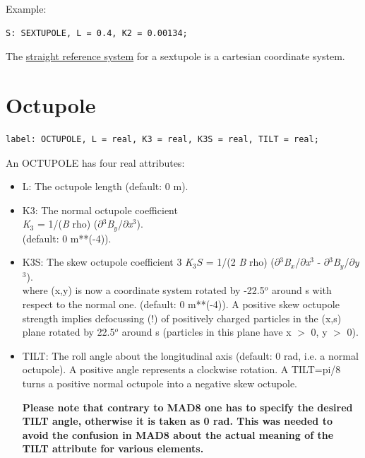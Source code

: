 Example: 
\begin{verbatim}
S: SEXTUPOLE, L = 0.4, K2 = 0.00134;
\end{verbatim} 

The \href{local_system.html#straight}{straight reference system} for a
sextupole is a cartesian coordinate system.   


%
\section{Octupole}
\label{sec:octupole}

\begin{verbatim}
label: OCTUPOLE, L = real, K3 = real, K3S = real, TILT = real;
\end{verbatim} 

An OCTUPOLE has four real attributes: 
\begin{itemize}
   \item L: The octupole length (default: 0 m). 

   \item K3: The normal octupole coefficient \\
     \textit{K}$_3$ = 1/(\textit{B} rho)
     ($\partial$$^3$\textit{B$_y$}/$\partial$\textit{x}$^3$). \\ 
     (default: 0 m**(-4)). 

   \item K3S: The skew octupole coefficient 
3%
     \textit{K}$_3S$ = 1/(2 \textit{B} rho)
     ($\partial$$^3$\textit{B$_x$}/$\partial$\textit{x}$^3$ -
     $\partial$$^3$\textit{B$_y$}/$\partial$\textit{y}$^3$). \\
     where (x,y) is now a coordinate system rotated by -22.5$^o$ around
     s with respect to the normal one. (default: 0 m**(-4)). A positive
     skew octupole strength implies defocussing (!) of positively
     charged particles in the (x,s) plane rotated by 22.5$^o$ around s
     (particles in this plane have x $>$ 0, y $>$ 0).  

   \item TILT: The roll angle about the longitudinal axis (default: 0
     rad, i.e. a normal octupole). A positive angle represents a
     clockwise rotation. A TILT=pi/8 turns a positive normal octupole
     into a negative skew octupole.  

     \textbf{  Please note that contrary to MAD8 one has to specify the
       desired TILT angle, otherwise it is taken as 0 rad. This was
       needed to avoid the confusion in MAD8 about the actual meaning of
       the TILT attribute for various elements. }

\end{itemize}

